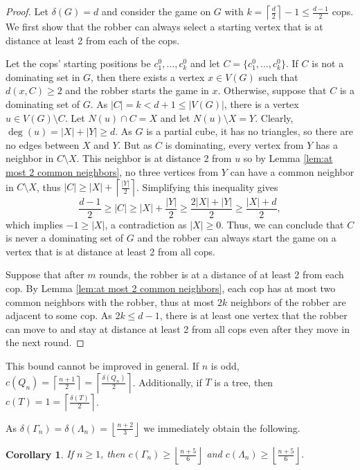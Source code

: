 \documentclass[11pt]{article}
\newtheorem{corollary}[theorem]{Corollary}
\newcommand{\ceil}[1]{\left\lceil #1 \right\rceil}
\newcommand{\floor}[1]{\left\lfloor #1 \right\rfloor}
\begin{document}
\begin{proof}
    Let $\delta(G) = d$ and consider the game on $G$ with $k = \left \lceil \frac{d}{2} \right \rceil - 1 \leq \frac{d-1}{2}$ cops. We first show that the robber can always select a starting vertex that is at distance at least 2 from each of the cops.

    Let the cops' starting positions be $c_1^0, \ldots, c_k^0$ and let $C = \{ c_1^0, \ldots, c_k^0 \}$. If $C$ is not a dominating set in $G$, then there exists a vertex $x \in V(G)$ such that $d(x, C) \geq 2$ and the robber starts the game in $x$. Otherwise, suppose that $C$ is a dominating set of $G$. As $|C| = k < d+1 \leq |V(G)|$, there is a vertex $u \in V(G) \setminus C$. Let $N(u) \cap C = X$ and let $N(u) \setminus X = Y$. Clearly, $\deg(u) = |X| + |Y| \geq d$. As $G$ is a partial cube, it has no triangles, so there are no edges between $X$ and $Y$. But as $C$ is dominating, every vertex from $Y$ has a neighbor in $C \setminus X$. This neighbor is at distance 2 from $u$ so by Lemma \ref{lem:at most 2 common neighbors}, no three vertices from $Y$ can have a common neighbor in $C \setminus X$, thus $|C| \geq |X| + \ceil{\frac{|Y|}{2}}$. Simplifying this inequality gives
    $$\frac{d-1}{2} \geq |C| \geq |X| + \frac{|Y|}{2} \geq \frac{2 |X| + |Y|}{2} \geq \frac{|X| + d}{2},$$
    which implies $-1 \geq |X|$, a contradiction as $|X| \geq 0$. Thus, we can conclude that $C$ is never a dominating set of $G$ and the robber can always start the game on a vertex that is at distance at least 2 from all cops. 
  
    Suppose that after $m$ rounds, the robber is at a distance of at least 2 from each cop. By Lemma \ref{lem:at most 2 common neighbors}, each cop has at most two common neighbors with the robber, thus at most $2k$ neighbors of the robber are adjacent to some cop. As $2k \leq d-1$, there is at least one vertex that the robber can move to and stay at distance at least 2 from all cops even after they move in the next round.
\end{proof}

This bound cannot be improved in general. If $n$ is odd, $c(Q_n) = \ceil{\frac{n+1}{2}} = \ceil{\frac{\delta(Q_n)}{2}}$. Additionally, if $T$ is a tree, then $c(T) = 1 = \ceil{\frac{\delta(T)}{2}}$.

As $\delta(\Gamma_n) = \delta(\Lambda_n) = \floor{\frac{n+2}{3}}$ \cite{book} we immediately obtain the following.

\begin{corollary}
    \label{cor:fib-lower}
    If $n \geq 1$, then $c(\Gamma_n) \geq \floor{\frac{n+5}{6}}$ and $c(\Lambda_n) \geq \floor{\frac{n+5}{6}}$.
\end{corollary}
\end{document}
